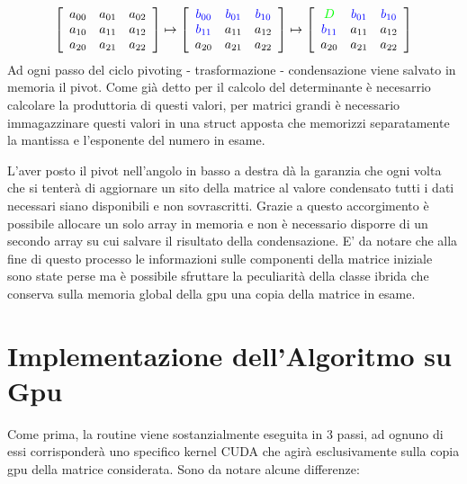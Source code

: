\documentclass{article}
\begin{document}
\begin{displaymath}
\left[ \begin{array}{ccc} a_{00} & a_{01} & a_{02} \\ a_{10} & a_{11} & a_{12} \\ a_{20} & a_{21} & a_{22}  \end{array} \right] 
\mapsto
\left[ \begin{array}{ccc} \color{blue}b_{00} & \color{blue}b_{01} & \color{blue}b_{10} \\ \color{blue}b_{11} & a_{11} & a_{12} \\ a_{20} & a_{21} & a_{22}  \end{array} \right] 
\mapsto
\left[ \begin{array}{ccc} \color{green}D & \color{blue}b_{01} & \color{blue}b_{10} \\ \color{blue}b_{11} & a_{11} & a_{12} \\ a_{20} & a_{21} & a_{22}  \end{array} \right]
\end{displaymath}
Ad ogni passo del ciclo pivoting - trasformazione - condensazione viene salvato in memoria il pivot. 
Come già detto per il calcolo del determinante è necesarrio calcolare la produttoria di questi valori, per matrici grandi è necessario immagazzinare questi valori in una struct apposta che memorizzi separatamente la mantissa e l'esponente del numero in esame.

L'aver posto il pivot nell'angolo in basso a destra dà la garanzia che ogni volta che si tenterà di aggiornare un sito della matrice al valore condensato tutti i dati necessari siano disponibili e non sovrascritti. Grazie a questo accorgimento è possibile allocare un solo array in memoria e non è necessario disporre di un secondo array su cui salvare il risultato della condensazione.
E' da notare che alla fine di questo processo le informazioni sulle componenti della matrice iniziale sono state perse ma è possibile sfruttare la peculiarità della classe ibrida che conserva sulla memoria global della gpu una copia della matrice in esame.


\section{Implementazione dell'Algoritmo su Gpu}
Come prima, la routine viene sostanzialmente eseguita in 3 passi, ad ognuno di essi corrisponderà uno specifico kernel CUDA che agirà esclusivamente sulla copia gpu della matrice considerata.
Sono da notare alcune differenze:
\end{document}
